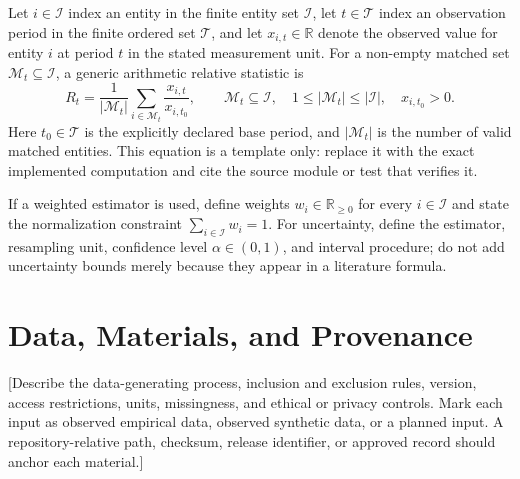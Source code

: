 \documentclass[10pt,a4paper]{article}
\begin{document}
Let $i \in \mathcal{I}$ index an entity in the finite entity set
$\mathcal{I}$, let $t \in \mathcal{T}$ index an observation period in the
finite ordered set $\mathcal{T}$, and let $x_{i,t} \in \mathbb{R}$ denote the
observed value for entity $i$ at period $t$ in the stated measurement unit.
For a non-empty matched set $\mathcal{M}_t \subseteq \mathcal{I}$, a generic
arithmetic relative statistic is
\begin{equation}
  R_t = \frac{1}{|\mathcal{M}_t|}
  \sum_{i \in \mathcal{M}_t}
  \frac{x_{i,t}}{x_{i,t_0}},
  \qquad
  \mathcal{M}_t \subseteq \mathcal{I},\quad
  1 \leq |\mathcal{M}_t| \leq |\mathcal{I}|,
  \quad x_{i,t_0} > 0.
\end{equation}
Here $t_0 \in \mathcal{T}$ is the explicitly declared base period, and
$|\mathcal{M}_t|$ is the number of valid matched entities. This equation is a
template only: replace it with the exact implemented computation and cite the
source module or test that verifies it.

If a weighted estimator is used, define weights $w_i \in \mathbb{R}_{\geq 0}$
for every $i \in \mathcal{I}$ and state the normalization constraint
$\sum_{i\in\mathcal{I}} w_i = 1$. For uncertainty, define the estimator,
resampling unit, confidence level $\alpha \in (0,1)$, and interval procedure;
do not add uncertainty bounds merely because they appear in a literature
formula.

\section{Data, Materials, and Provenance}
[Describe the data-generating process, inclusion and exclusion rules, version,
  access restrictions, units, missingness, and ethical or privacy
  controls. Mark
  each input as observed empirical data, observed synthetic data, or a planned
  input. A repository-relative path, checksum, release identifier, or approved
record should anchor each material.]
\end{document}
